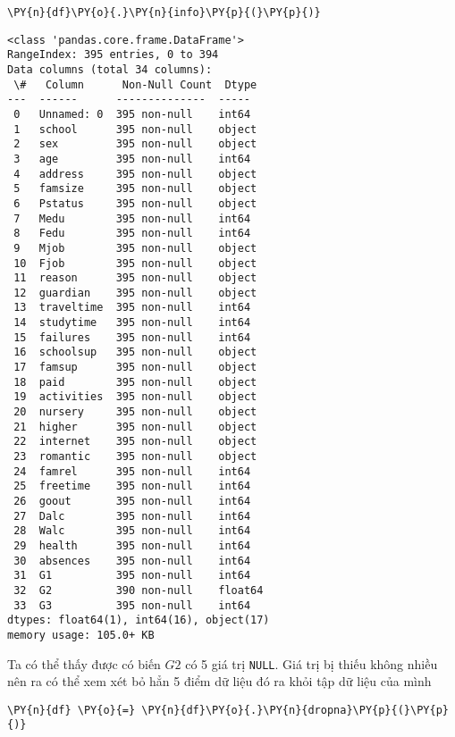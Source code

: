     \begin{tcolorbox}[breakable, size=fbox, boxrule=1pt, pad at break*=1mm,colback=cellbackground, colframe=cellborder]
\begin{Verbatim}[commandchars=\\\{\}]
\PY{n}{df}\PY{o}{.}\PY{n}{info}\PY{p}{(}\PY{p}{)}
\end{Verbatim}
\end{tcolorbox}

    \begin{Verbatim}[commandchars=\\\{\}]
<class 'pandas.core.frame.DataFrame'>
RangeIndex: 395 entries, 0 to 394
Data columns (total 34 columns):
 \#   Column      Non-Null Count  Dtype
---  ------      --------------  -----
 0   Unnamed: 0  395 non-null    int64
 1   school      395 non-null    object
 2   sex         395 non-null    object
 3   age         395 non-null    int64
 4   address     395 non-null    object
 5   famsize     395 non-null    object
 6   Pstatus     395 non-null    object
 7   Medu        395 non-null    int64
 8   Fedu        395 non-null    int64
 9   Mjob        395 non-null    object
 10  Fjob        395 non-null    object
 11  reason      395 non-null    object
 12  guardian    395 non-null    object
 13  traveltime  395 non-null    int64
 14  studytime   395 non-null    int64
 15  failures    395 non-null    int64
 16  schoolsup   395 non-null    object
 17  famsup      395 non-null    object
 18  paid        395 non-null    object
 19  activities  395 non-null    object
 20  nursery     395 non-null    object
 21  higher      395 non-null    object
 22  internet    395 non-null    object
 23  romantic    395 non-null    object
 24  famrel      395 non-null    int64
 25  freetime    395 non-null    int64
 26  goout       395 non-null    int64
 27  Dalc        395 non-null    int64
 28  Walc        395 non-null    int64
 29  health      395 non-null    int64
 30  absences    395 non-null    int64
 31  G1          395 non-null    int64
 32  G2          390 non-null    float64
 33  G3          395 non-null    int64
dtypes: float64(1), int64(16), object(17)
memory usage: 105.0+ KB
    \end{Verbatim}

    Ta có thể thấy được có biến \(G2\) có 5 giá trị \texttt{NULL}. Giá trị
bị thiếu không nhiều nên ra có thể xem xét bỏ hẳn 5 điểm dữ liệu đó ra
khỏi tập dữ liệu của mình

    \begin{tcolorbox}[breakable, size=fbox, boxrule=1pt, pad at break*=1mm,colback=cellbackground, colframe=cellborder]
\begin{Verbatim}[commandchars=\\\{\}]
\PY{n}{df} \PY{o}{=} \PY{n}{df}\PY{o}{.}\PY{n}{dropna}\PY{p}{(}\PY{p}{)}
\end{Verbatim}
\end{tcolorbox}

